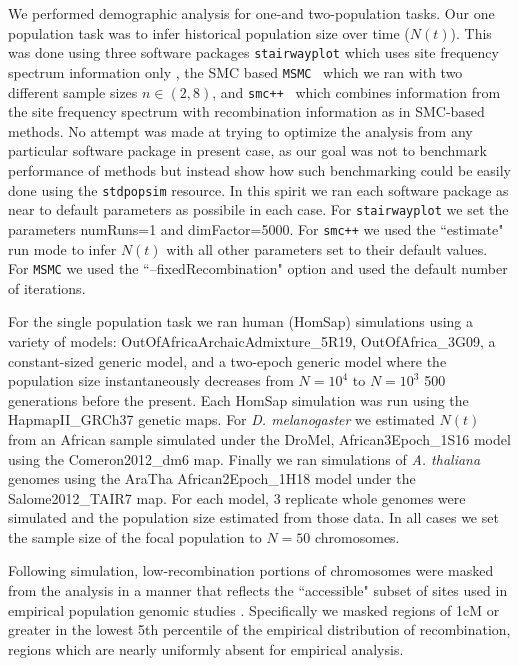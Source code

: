 \documentclass[12pt,halfline,a4paper]{ouparticle}
\newcommand{\stdpopsim}{\texttt{stdpopsim}\xspace}
\newcommand{\MSMC}{\texttt{MSMC}\xspace}
\newcommand{\smcpp}{\texttt{smc++}\xspace}
\newcommand{\stairwayplot}{\texttt{stairwayplot}\xspace}
\begin{document}
We performed demographic analysis for one-and two-population tasks.
Our one population task was to infer historical population size over
time ($N(t)$). This was done using three software packages \stairwayplot
which uses site frequency spectrum information only \citep{liu2015exploring},
the SMC based \MSMC~\citep{schiffels2014inferring} which we ran with two different
sample sizes $n\in (2 , 8)$, and \smcpp~\citep{terhorst2017robust}
which combines information from the site frequency spectrum with
recombination information as in SMC-based methods. No attempt
was made at trying to optimize the analysis from
any particular software package in present case,
as our goal was not to benchmark performance of methods but
instead show how such benchmarking could be easily done using
the \stdpopsim resource. In this spirit we ran each software package as near
to default parameters as possibile in each case. For \stairwayplot we
set the parameters numRuns=1 and dimFactor=5000. For \smcpp we used the
``estimate" run mode to infer $N(t)$ with all other parameters set
to their default values. For \MSMC we used the ``--fixedRecombination"
option and used the default number of iterations.

For the single population task we ran human (HomSap) simulations
using a variety of models: OutOfAfricaArchaicAdmixture\_5R19, OutOfAfrica\_3G09,
a constant-sized generic model, and a two-epoch generic model where the
population size instantaneously decreases from $N=10^4$ to $N=10^3$ 500
generations before the present. Each HomSap simulation was run
using the HapmapII\_GRCh37 genetic maps. For \emph{D. melanogaster}
we estimated $N(t)$ from an African sample simulated under the DroMel,
African3Epoch\_1S16 model using the Comeron2012\_dm6 map. Finally we ran
simulations of \emph{A. thaliana} genomes using the AraTha African2Epoch\_1H18
model under the Salome2012\_TAIR7 map. For each model, 3 replicate whole genomes were
simulated and the population size estimated from those data. In all cases we
set the sample size of the focal population to $N=50$ chromosomes.

Following simulation, low-recombination portions of chromosomes were masked
from the analysis in a manner that reflects the ``accessible" subset of sites
used in empirical population genomic studies \citep[e.g.,][]{danecek20111000,langley2012genomic}.
Specifically we masked regions of 1cM or greater in the lowest 5th percentile of the empirical
distribution of recombination, regions which are nearly uniformly absent for
empirical analysis.
\end{document}
